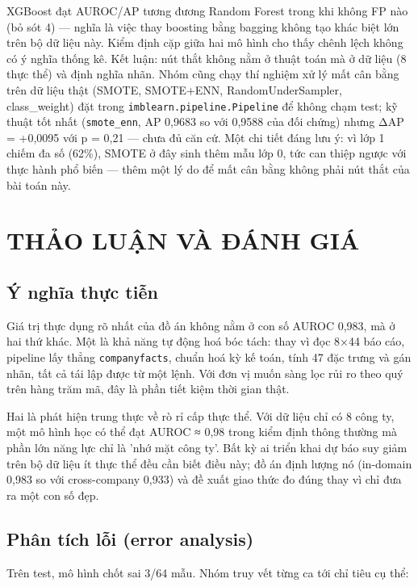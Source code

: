 \documentclass[13pt,a4paper]{extreport}
\begin{document}
XGBoost đạt AUROC/AP tương đương Random Forest trong khi không FP nào (bỏ sót 4) — nghĩa là việc thay boosting bằng bagging không tạo khác biệt lớn trên bộ dữ liệu này. Kiểm định cặp giữa hai mô hình cho thấy chênh lệch không có ý nghĩa thống kê. Kết luận: nút thắt không nằm ở thuật toán mà ở dữ liệu (8 thực thể) và định nghĩa nhãn. Nhóm cũng chạy thí nghiệm xử lý mất cân bằng trên dữ liệu thật (SMOTE, SMOTE+ENN, RandomUnderSampler, class\_weight) đặt trong \texttt{imblearn.pipeline.Pipeline} để không chạm test; kỹ thuật tốt nhất (\texttt{smote\_enn}, AP 0,9683 so với 0,9588 của đối chứng) nhưng ΔAP = +0,0095 với p = 0,21 — chưa đủ căn cứ. Một chi tiết đáng lưu ý: vì lớp 1 chiếm đa số (62\%), SMOTE ở đây sinh thêm mẫu lớp 0, tức can thiệp ngược với thực hành phổ biến — thêm một lý do để mất cân bằng không phải nút thắt của bài toán này.

\clearpage

\chapter{THẢO LUẬN VÀ ĐÁNH GIÁ}

\section{Ý nghĩa thực tiễn}

Giá trị thực dụng rõ nhất của đồ án không nằm ở con số AUROC 0,983, mà ở hai thứ khác. Một là khả năng tự động hoá bóc tách: thay vì đọc 8×44 báo cáo, pipeline lấy thẳng \texttt{companyfacts}, chuẩn hoá kỳ kế toán, tính 47 đặc trưng và gán nhãn, tất cả tái lập được từ một lệnh. Với đơn vị muốn sàng lọc rủi ro theo quý trên hàng trăm mã, đây là phần tiết kiệm thời gian thật.

Hai là phát hiện trung thực về rò rỉ cấp thực thể. Với dữ liệu chỉ có 8 công ty, một mô hình học có thể đạt AUROC ≈ 0,98 trong kiểm định thông thường mà phần lớn năng lực chỉ là 'nhớ mặt công ty'. Bất kỳ ai triển khai dự báo suy giảm trên bộ dữ liệu ít thực thể đều cần biết điều này; đồ án định lượng nó (in-domain 0,983 so với cross-company 0,933) và đề xuất giao thức đo đúng thay vì chỉ đưa ra một con số đẹp.

\section{Phân tích lỗi (error analysis)}

Trên test, mô hình chốt sai 3/64 mẫu. Nhóm truy vết từng ca tới chỉ tiêu cụ thể:
\end{document}
